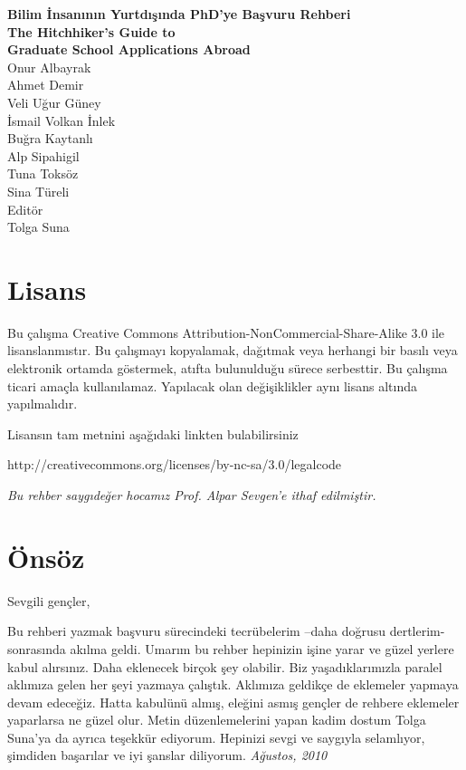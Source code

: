 \documentclass[12pt]{article}
\begin{document}
%
%
\thispagestyle{empty}
\setcounter{page}{0}
\begin{center}
\textbf{\Huge{Bilim İnsanının Yurtdışında PhD'ye Başvuru Rehberi} \\
\vspace{8mm}
\Large{The Hitchhiker's Guide to \\ 
\vspace{4mm}
Graduate School Applications Abroad}}\\

\vfill
\Large{Onur Albayrak} 
\\
Ahmet Demir
\\
Veli Uğur Güney 
\\
İsmail Volkan İnlek
\\
Buğra Kaytanlı 
\\
Alp Sipahigil 
\\
Tuna Toksöz 
\\
Sina Türeli 
\\
\vspace{8mm}
\large{
Editör 
\\
Tolga Suna }
\end{center}
%
%
\newpage
\section*{Lisans}

Bu çalışma Creative Commons Attribution-NonCommercial-Share-Alike 3.0 ile lisanslanmıstır. Bu çalışmayı kopyalamak, dağıtmak veya herhangi bir basılı veya elektronik ortamda göstermek, atıfta bulunulduğu sürece serbesttir. Bu çalışma ticari amaçla kullanılamaz. Yapılacak olan değişiklikler aynı lisans altında yapılmalıdır. 

Lisansın tam metnini aşağıdaki linkten bulabilirsiniz

http://creativecommons.org/licenses/by-nc-sa/3.0/legalcode

\byncsa
\newpage
%
%
\vspace*{45mm} 
\textit{Bu rehber saygıdeğer hocamız Prof. Alpar Sevgen'e ithaf edilmiştir.}
%
\newpage
%
%
\tableofcontents
%
\newpage

%
%
\section{Önsöz}
Sevgili gençler,

Bu rehberi yazmak başvuru sürecindeki tecrübelerim –daha doğrusu dertlerim- sonrasında akılma geldi. Umarım bu rehber hepinizin işine yarar ve güzel yerlere kabul alırsınız. Daha eklenecek birçok şey olabilir. Biz yaşadıklarımızla paralel aklımıza gelen her şeyi yazmaya çalıştık. Aklımıza geldikçe de eklemeler yapmaya devam edeceğiz. Hatta kabulünü almış, eleğini asmış gençler de rehbere eklemeler yaparlarsa ne güzel olur. Metin düzenlemelerini yapan kadim dostum Tolga Suna’ya da ayrıca teşekkür ediyorum. Hepinizi sevgi ve saygıyla selamlıyor, şimdiden başarılar ve iyi şanslar diliyorum. \textit{Ağustos, 2010}
\end{document}
